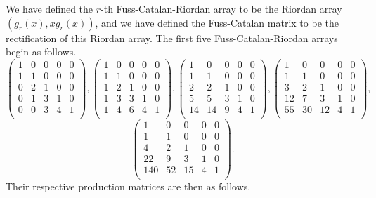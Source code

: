 \documentclass[12pt,reqno]{article}
\theoremstyle{definition}
\begin{document}
We have defined the $r$-th Fuss-Catalan-Riordan array to be the Riordan array $(g_r(x), xg_r(x))$, and we have defined the Fuss-Catalan matrix to be the rectification of this Riordan array. The first five Fuss-Catalan-Riordan arrays begin as follows.
$$\left(
\begin{array}{ccccc}
1& 0 & 0 & 0 & 0 \\
1 & 1 & 0 & 0 & 0 \\
0 & 2 & 1 & 0 & 0 \\
0 & 1 & 3 & 1 & 0  \\
0 & 0 & 3 & 4 & 1 \\
\end{array}\right),\left(
\begin{array}{ccccc}
1& 0 & 0 & 0 & 0 \\
1 & 1 & 0 & 0 & 0 \\
1 & 2 & 1 & 0 & 0 \\
1 & 3 & 3 & 1 & 0  \\
1 &4 & 6 & 4 & 1 \\
\end{array}\right),\left(
\begin{array}{ccccc}
1& 0 & 0 & 0 & 0 \\
1 & 1 & 0 & 0 & 0 \\
2 & 2 & 1 & 0 & 0 \\
5 & 5 & 3 & 1 & 0  \\
14 &14 & 9 & 4 & 1 \\
\end{array}\right),\left(
\begin{array}{ccccc}
1& 0 & 0 & 0 & 0 \\
1 & 1 & 0 & 0 & 0 \\
3 & 2 & 1 & 0 & 0 \\
12 & 7 & 3 & 1 & 0  \\
55 &30 & 12 & 4 & 1 \\
\end{array}\right),$$
$$\left(
\begin{array}{ccccc}
1& 0 & 0 & 0 & 0 \\
1 & 1 & 0 & 0 & 0 \\
4 & 2 & 1 & 0 & 0 \\
22 & 9 & 3 & 1 & 0  \\
140 &52 & 15 & 4 & 1 \\
\end{array}\right).$$ Their respective production matrices are then as follows.
\end{document}
